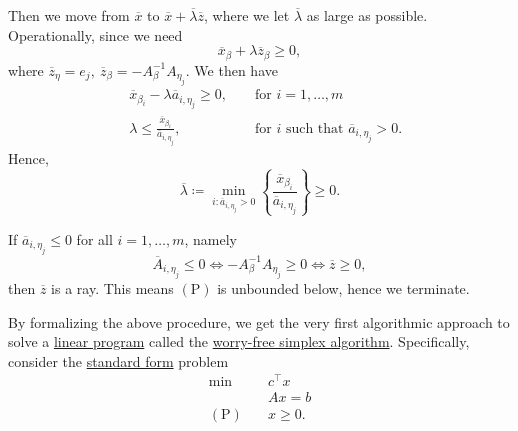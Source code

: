 \begin{enumerate}[(a)]
	      Then we move from \(\overline{x}\) to \(\overline{x}+\overline{\lambda} \overline{z}\), where we let \(\overline{\lambda}\) as large as possible.
	      Operationally, since we need
	      \[
		      \overline{x}_{\beta} + \lambda \overline{z}_{\beta} \geq 0,
	      \]
	      where \(\overline{z}_{\eta} = e_{j},\ \overline{z}_{\beta} = -A^{-1}_{\beta}A_{\eta_{j}}\). We then have
	      \[
		      \begin{alignedat}{3}
			      &\overline{x}_{\beta_{i}} - \lambda \overline{a}_{i, \eta_{j}}\geq 0, &&\text{ for }i = 1, \dots , m\\
			      & \lambda \leq \frac{\overline{x}_{\beta_{i}}}{\overline{a}_{i, \eta_{j}}}, &&\text{ for }i \text{ such that }\overline{a}_{i, \eta_j}>0.
		      \end{alignedat}
	      \]
	      Hence,
	      \[
		      \overline{\lambda} \coloneqq \min_{i: \overline{a}_{i, \eta_{j}}>0} \left\{ \frac{\overline{x}_{\beta_{i}}}{\overline{a}_{i, \eta_{j}}} \right\} \geq 0.
	      \]
	      \begin{remark}
		      If \(\overline{a}_{i, \eta_{j}}\leq 0\) for all \(i = 1, \dots , m\), namely
		      \[
			      \overline{A}_{i, \eta_{j}}\leq 0 \iff -A^{-1}_{\beta}A_{\eta_{j}}\geq 0 \iff \overline{z}\geq 0,
		      \]
		      then \(\overline{z}\) is a ray. This means \((\mathrm{P})\) is unbounded below, hence we terminate.
	      \end{remark}
\end{enumerate}

By formalizing the above procedure, we get the very first algorithmic approach to solve a \hyperref[def:general-linear-programming-problem]{linear program} called the \hyperref[algo:worry-free-simplex-algorithm]{worry-free simplex algorithm}. Specifically, consider the \hyperref[def:standard-form]{standard form} problem
\[
	\begin{aligned}
		\min~             & c^{\top}x \\
		                  & Ax = b    \\
		(\mathrm{P})\quad & x\geq  0.
	\end{aligned}
\]

